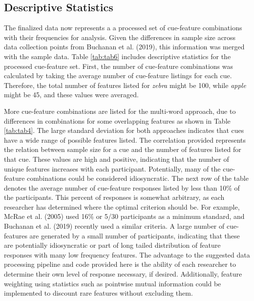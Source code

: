 \documentclass[man]{apa6}
\begin{document}
\normalsize

\hypertarget{descriptive-statistics}{%
\subsection{Descriptive Statistics}\label{descriptive-statistics}}

The finalized data now represents a a processed set of cue-feature combinations with their frequencies for analysis. Given the differences in sample size across data collection points from Buchanan et al. (2019), this information was merged with the sample data. Table \ref{tab:tab6} includes descriptive statistics for the processed cue-feature set. First, the number of cue-feature combinations was calculated by taking the average number of cue-feature listings for each cue. Therefore, the total number of features listed for \emph{zebra} might be 100, while \emph{apple} might be 45, and these values were averaged.

More cue-feature combinations are listed for the multi-word approach, due to differences in combinations for some overlapping features as shown in Table \ref{tab:tab4}. The large standard deviation for both approaches indicates that cues have a wide range of possible features listed. The correlation provided represents the relation between sample size for a cue and the number of features listed for that cue. These values are high and positive, indicating that the number of unique features increases with each participant. Potentially, many of the cue-feature combinations could be considered idiosyncratic. The next row of the table denotes the average number of cue-feature responses listed by less than 10\% of the participants. This percent of responses is somewhat arbitrary, as each researcher has determined where the optimal criterion should be. For example, McRae et al. (2005) used 16\% or 5/30 participants as a minimum standard, and Buchanan et al. (2019) recently used a similar criteria. A large number of cue-features are generated by a small number of participants, indicating that these are potentially idiosyncratic or part of long tailed distribution of feature responses with many low frequency features. The advantage to the suggested data processing pipeline and code provided here is the ability of each researcher to determine their own level of response necessary, if desired. Additionally, feature weighting using statistics such as pointwise mutual information could be implemented to discount rare features without excluding them.
\end{document}
